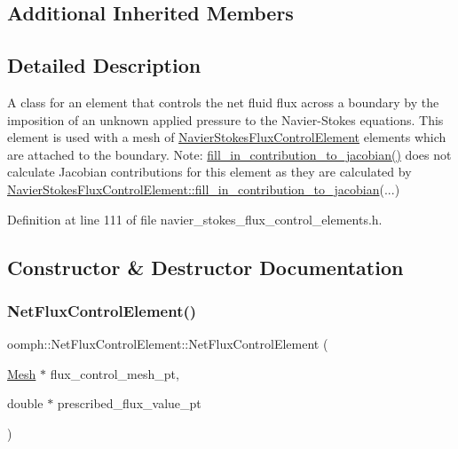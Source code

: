 \subsection*{Additional Inherited Members}


\subsection{Detailed Description}
A class for an element that controls the net fluid flux across a boundary by the imposition of an unknown applied pressure to the Navier-\/\+Stokes equations. This element is used with a mesh of \hyperlink{classoomph_1_1NavierStokesFluxControlElement}{Navier\+Stokes\+Flux\+Control\+Element} elements which are attached to the boundary. Note\+: \hyperlink{classoomph_1_1NetFluxControlElement_a7b7d3a32fcad5b06fe6a49f05f2c01a9}{fill\+\_\+in\+\_\+contribution\+\_\+to\+\_\+jacobian()} does not calculate Jacobian contributions for this element as they are calculated by \hyperlink{classoomph_1_1NavierStokesFluxControlElement_a6a745b0b8b1417b7f61782e959c31f69}{Navier\+Stokes\+Flux\+Control\+Element\+::fill\+\_\+in\+\_\+contribution\+\_\+to\+\_\+jacobian}(...) 

Definition at line 111 of file navier\+\_\+stokes\+\_\+flux\+\_\+control\+\_\+elements.\+h.



\subsection{Constructor \& Destructor Documentation}
\mbox{\label{classoomph_1_1NetFluxControlElement_aa855e7600ca93b005e63c8b2d4484f45}} 
\subsubsection{\texorpdfstring{Net\+Flux\+Control\+Element()}{NetFluxControlElement()}\hspace{0.1cm}{\footnotesize\ttfamily [1/2]}}
{\footnotesize\ttfamily oomph\+::\+Net\+Flux\+Control\+Element\+::\+Net\+Flux\+Control\+Element (\begin{DoxyParamCaption}\item[{\hyperlink{classoomph_1_1Mesh}{Mesh} $\ast$}]{flux\+\_\+control\+\_\+mesh\+\_\+pt,  }\item[{double $\ast$}]{prescribed\+\_\+flux\+\_\+value\+\_\+pt }\end{DoxyParamCaption})\hspace{0.3cm}{\ttfamily [inline]}}




